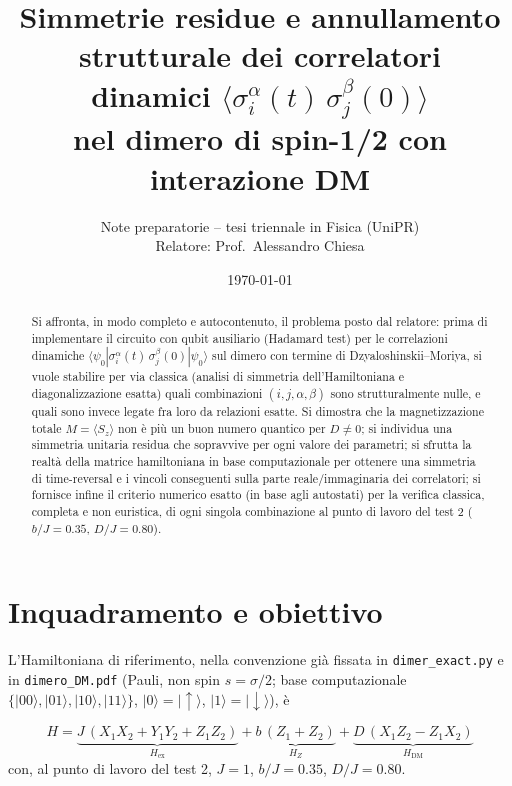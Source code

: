 \documentclass[11pt,a4paper]{article}
\title{Simmetrie residue e annullamento strutturale dei correlatori\\
dinamici $\langle\sigma_i^\alpha(t)\,\sigma_j^\beta(0)\rangle$\\[2pt]
\large nel dimero di spin-1/2 con interazione DM}
\author{Note preparatorie -- tesi triennale in Fisica (UniPR)\\
Relatore: Prof.\ Alessandro Chiesa}
\date{\today}
\begin{document}
\maketitle

\begin{abstract}
\noindent
Si affronta, in modo completo e autocontenuto, il problema posto dal relatore: prima di
implementare il circuito con qubit ausiliario (Hadamard test) per le correlazioni dinamiche
$\langle\psi_0|\sigma_i^\alpha(t)\,\sigma_j^\beta(0)|\psi_0\rangle$ sul dimero con termine di
Dzyaloshinskii--Moriya, si vuole stabilire per via classica (analisi di simmetria
dell'Hamiltoniana e diagonalizzazione esatta) quali combinazioni $(i,j,\alpha,\beta)$ sono
strutturalmente nulle, e quali sono invece legate fra loro da relazioni esatte. Si dimostra che
la magnetizzazione totale $M=\langle S_z\rangle$ non è più un buon numero quantico per $D\neq0$;
si individua una simmetria unitaria residua che sopravvive per ogni valore dei parametri; si
sfrutta la realtà della matrice hamiltoniana in base computazionale per ottenere una simmetria
di time-reversal e i vincoli conseguenti sulla parte reale/immaginaria dei correlatori; si
fornisce infine il criterio numerico esatto (in base agli autostati) per la verifica classica,
completa e non euristica, di ogni singola combinazione al punto di lavoro del test 2
($b/J=0.35$, $D/J=0.80$).
\end{abstract}

\tableofcontents

\section{Inquadramento e obiettivo}

L'Hamiltoniana di riferimento, nella convenzione già fissata in \texttt{dimer\_exact.py} e in
\texttt{dimero\_DM.pdf} (Pauli, non spin $s=\sigma/2$; base computazionale
$\{|00\rangle,|01\rangle,|10\rangle,|11\rangle\}$, $|0\rangle=|\!\uparrow\rangle$,
$|1\rangle=|\!\downarrow\rangle$), è

\begin{equation}
H = \underbrace{J\,(X_1X_2+Y_1Y_2+Z_1Z_2)}_{H_{\mathrm{ex}}}
  + \underbrace{b\,(Z_1+Z_2)}_{H_Z}
  + \underbrace{D\,(X_1Z_2-Z_1X_2)}_{H_{\mathrm{DM}}}
\label{eq:H}
\end{equation}
con, al punto di lavoro del test 2, $J=1$, $b/J=0.35$, $D/J=0.80$.
\end{document}
